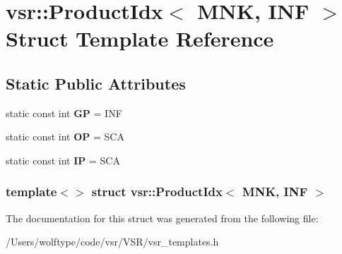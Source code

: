 \hypertarget{structvsr_1_1_product_idx_3_01_m_n_k_00_01_i_n_f_01_4}{\section{vsr\-:\-:Product\-Idx$<$ M\-N\-K, I\-N\-F $>$ Struct Template Reference}
\label{structvsr_1_1_product_idx_3_01_m_n_k_00_01_i_n_f_01_4}
}
\subsection*{Static Public Attributes}
\begin{DoxyCompactItemize}
\item 
\hypertarget{structvsr_1_1_product_idx_3_01_m_n_k_00_01_i_n_f_01_4_abaa1213299203a581034a8d8d12f3fdb}{static const int {\bfseries G\-P} = I\-N\-F}\label{structvsr_1_1_product_idx_3_01_m_n_k_00_01_i_n_f_01_4_abaa1213299203a581034a8d8d12f3fdb}

\item 
\hypertarget{structvsr_1_1_product_idx_3_01_m_n_k_00_01_i_n_f_01_4_a62ff2e0eb57808e791b743b47f04fc9a}{static const int {\bfseries O\-P} = S\-C\-A}\label{structvsr_1_1_product_idx_3_01_m_n_k_00_01_i_n_f_01_4_a62ff2e0eb57808e791b743b47f04fc9a}

\item 
\hypertarget{structvsr_1_1_product_idx_3_01_m_n_k_00_01_i_n_f_01_4_a577c029d3e042ec9a36b5de05ff03fb8}{static const int {\bfseries I\-P} = S\-C\-A}\label{structvsr_1_1_product_idx_3_01_m_n_k_00_01_i_n_f_01_4_a577c029d3e042ec9a36b5de05ff03fb8}

\end{DoxyCompactItemize}
\subsubsection*{template$<$$>$ struct vsr\-::\-Product\-Idx$<$ M\-N\-K, I\-N\-F $>$}



The documentation for this struct was generated from the following file\-:\begin{DoxyCompactItemize}
\item 
/\-Users/wolftype/code/vsr/\-V\-S\-R/vsr\-\_\-templates.\-h\end{DoxyCompactItemize}
